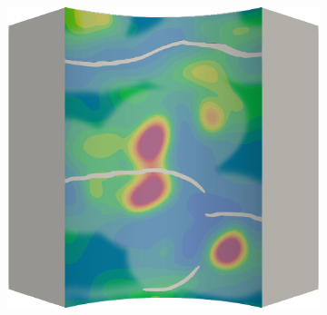 \begin{frame}
\begin{columns}[T]
\begin{column}{0.6\textwidth}
\begin{figure}
{\begin{subfigure}{0.19\textwidth}
          \end{subfigure}
          \hspace{0.06\textwidth}
          \begin{subfigure}{0.19\textwidth}
            \centering
            \includegraphics[width=\textwidth]{Chapter345/figures/ep.0030}
          \end{subfigure}
        }
        

\end{figure}
\end{column}
\end{columns}
\end{frame}
